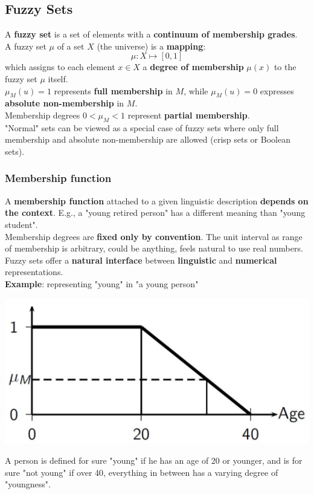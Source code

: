 \newpage

\subsection{Fuzzy Sets}

A \textbf{fuzzy set} is a set of elements with a \textbf{continuum of membership grades}.\\

A fuzzy set $\mu$ of a set $X$ (the universe) is a \textbf{mapping}: 
$$ \mu : X \mapsto [0,1] $$
which assigns to each element $x \in X$ a \textbf{degree of membership} $\mu(x)$ to the fuzzy set $\mu$ itself.\\

$\mu_M (u) = 1$ represents \textbf{full membership} in $M$, while $\mu_M (u) = 0$ expresses \textbf{absolute non-membership} in $M$.\\
Membership degrees $0 < \mu_M < 1$ represent \textbf{partial membership}.\\

"Normal" sets can be viewed as a special case of fuzzy sets where only full membership and absolute non-membership are allowed (crisp sets or Boolean sets).\\

\newpage

\subsubsection{Membership function}

A \textbf{membership function} attached to a given linguistic description \textbf{depends on the context}. E.g., a "young retired person" has a different meaning than "young student".\\

Membership degrees are \textbf{fixed only by convention}. The unit interval as range of membership is arbitrary, could be anything, feels natural to use real numbers.\\

Fuzzy sets offer a \textbf{natural interface} between \textbf{linguistic} and \textbf{numerical} representations.\\

\textbf{Example}: representing "young" in "a young person"
\begin{center}
	\includegraphics[width=0.5\columnwidth]{img/FS/young1}
\end{center}
A person is defined for sure "young" if he has an age of 20 or younger, and is for sure "not young" if over 40, everything in between has a varying degree of "youngness".\\

